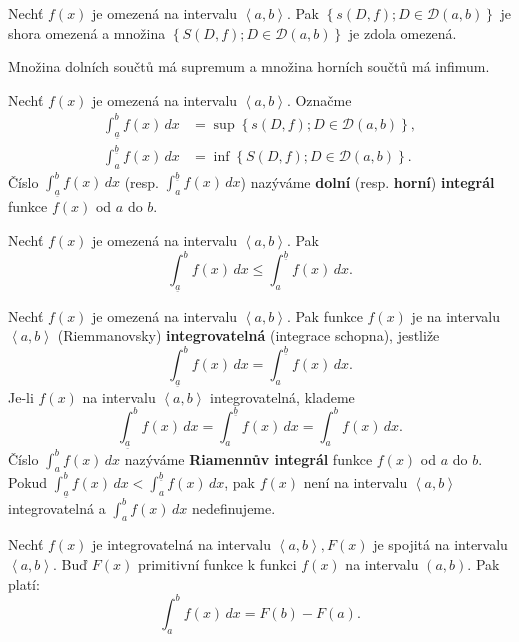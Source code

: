 \begin{veta}
Nechť $f(x)$ je omezená na intervalu $\left < a,b \right >. $ Pak
$\left \{ s(D,f); D\in \mathscr D(a,b) \right \} $ je shora omezená a množina
$\left \{ S(D,f); D\in \mathscr D(a,b) \right \} $ je zdola omezená.
\end{veta}

\begin{pozn}
     Množina dolních součtů má supremum a množina horních součtů má infimum.
\end{pozn}

\begin{definition}
Nechť $f(x)$ je omezená na intervalu $\left < a,b \right > .$ Označme
\begin{align*}
    \int_{\underline{a}} ^b f(x) \, dx & = \sup \left \{ s(D,f); D \in \mathscr D(a,b) \right \}, \\
    \int_{a} ^{\underline{b}} f(x) \, dx & = \inf \left \{ S(D,f); D \in \mathscr D(a,b) \right \}.
\end{align*}
Číslo $\int_{\underline{a}} ^b f(x)\, dx$ (resp. $\int_{a} ^{\underline{b}} f(x) \, dx$)
nazýváme \textbf{dolní} (resp. \textbf{horní}) \textbf{integrál} funkce $f(x)$ od
$a$ do $b$.
\end{definition}

\begin{veta}
Nechť $f(x)$ je omezená na intervalu $\left < a,b \right >. $ Pak
$$\int_{\underline{a}} ^b f(x)\, dx \leq \int_{a} ^{\underline{b}} f(x) \, dx.$$
\end{veta}

\begin{definition}
Nechť $f(x)$ je omezená na intervalu $\left < a,b \right > .$ Pak funkce
$f(x)$ je na intervalu $\left < a,b \right > $ (Riemmanovsky) \textbf{integrovatelná}
(integrace schopna), jestliže
$$\int_{\underline{a}} ^b f(x)\, dx = \int_{a} ^{\underline{b}} f(x) \, dx.$$
Je-li $f(x)$ na intervalu $\left < a,b \right > $ integrovatelná, klademe
$$\int_{\underline{a}} ^b f(x)\, dx = \int_{a} ^{\underline{b}} f(x) \, dx = \int_{a} ^b f(x) \, dx.$$
Číslo $\int_{a} ^b f(x)\, dx$ nazýváme \textbf{Riamennův integrál} funkce $f(x)$ od
$a$ do $b$. Pokud $\int_{\underline{a}} ^b f(x)\, dx < \int_{a} ^{\underline{b}} f(x) \, dx$,
pak $f(x)$ není na intervalu $\left < a,b \right > $ integrovatelná a
$\int_{a} ^b f(x)\, dx$ nedefinujeme.
\end{definition}

\begin{veta}
Nechť $f(x)$ je integrovatelná na intervalu $\left < a,b \right > , F(x)$ je spojitá
na intervalu $\left < a,b \right > $. Buď $F(x)$ primitivní funkce k funkci $f(x)$
na intervalu $\left ( a,b \right ) $. Pak platí:
$$\int_{a} ^b f(x)\, dx=F(b)-F(a).$$
\end{veta}

